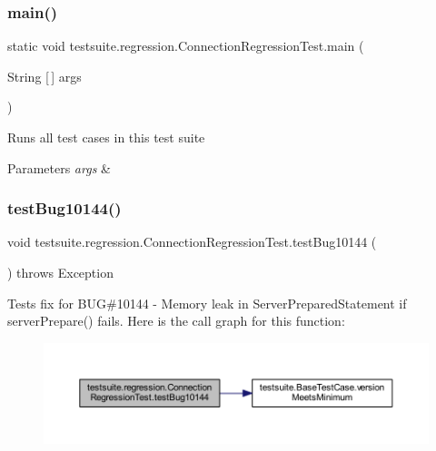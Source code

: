 \subsubsection{\texorpdfstring{main()}{main()}}
{\footnotesize\ttfamily static void testsuite.\+regression.\+Connection\+Regression\+Test.\+main (\begin{DoxyParamCaption}\item[{String \mbox{[}$\,$\mbox{]}}]{args }\end{DoxyParamCaption})\hspace{0.3cm}{\ttfamily [static]}}

Runs all test cases in this test suite


\begin{DoxyParams}{Parameters}
{\em args} & \\
\hline
\end{DoxyParams}
\mbox{\label{classtestsuite_1_1regression_1_1_connection_regression_test_aff36d0acf4519875786c945621230acb}} 
\subsubsection{\texorpdfstring{test\+Bug10144()}{testBug10144()}}
{\footnotesize\ttfamily void testsuite.\+regression.\+Connection\+Regression\+Test.\+test\+Bug10144 (\begin{DoxyParamCaption}{ }\end{DoxyParamCaption}) throws Exception}

Tests fix for B\+UG\#10144 -\/ Memory leak in Server\+Prepared\+Statement if server\+Prepare() fails. Here is the call graph for this function\+:
\nopagebreak
\begin{figure}[H]
\begin{center}
\leavevmode
\includegraphics[width=350pt]{classtestsuite_1_1regression_1_1_connection_regression_test_aff36d0acf4519875786c945621230acb_cgraph}
\end{center}
\end{figure}
\mbox{\label{classtestsuite_1_1regression_1_1_connection_regression_test_a1a46119260190c85a4b8e8acbe3e9279}} 
